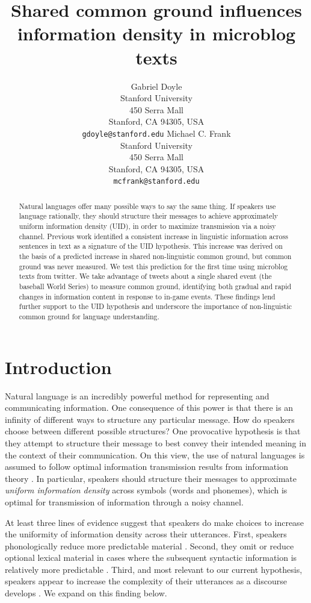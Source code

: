 \documentclass[11pt,letterpaper]{article}
\title{Shared common ground influences information density in microblog texts\Thanks{Thanks to...}}
\author{Gabriel Doyle\\
	    Stanford University\\
	    450 Serra Mall\\
	    Stanford, CA 94305, USA\\
	    {\tt gdoyle@stanford.edu}
	  \And
          Michael C. Frank\\
	    Stanford University\\
	    450 Serra Mall\\
	    Stanford, CA 94305, USA\\
	    {\tt mcfrank@stanford.edu}}
\date{}
\begin{document}
\maketitle
\begin{abstract}
Natural languages offer many possible ways to say the same thing. If speakers use language rationally, they should structure their messages to achieve approximately uniform information density (UID), in order to maximize transmission via a noisy channel. Previous work identified a consistent increase in linguistic information across sentences in text as a signature of the UID hypothesis. This increase was derived on the basis of a predicted increase in shared non-linguistic common ground, but common ground was never measured. We test this prediction for the first time using microblog texts from twitter. We take advantage of tweets about a single shared event (the baseball World Series) to measure common ground, identifying both gradual and rapid changes in information content in response to in-game events. These findings lend further support to the UID hypothesis and underscore the importance of non-linguistic common ground for language understanding.
\end{abstract}

\section{Introduction}

Natural language is an incredibly powerful method for representing and communicating information. One consequence of this power is that there is an infinity of different ways to structure any particular message. How do speakers choose between different possible structures? One provocative hypothesis is that they attempt to structure their message to best convey their intended meaning in the context of their communication. On this view, the use of natural languages is assumed to follow optimal information transmission results from information theory \cite{shannon1948}. In particular, speakers should structure their messages to approximate \emph{uniform information density} across symbols (words and phonemes), which is optimal for transmission of information through a noisy channel. 

At least three lines of evidence suggest that speakers do make choices to increase the uniformity of information density across their utterances. First, speakers phonologically reduce more predictable material \cite{aylett2004,aylett2006}. Second, they omit or reduce optional lexical material in cases where the subsequent syntactic information is relatively more predictable \cite{levy2007,frank2008,jaeger2010}. Third, and most relevant to our current hypothesis, speakers appear to increase the complexity of their utterances as a discourse develops \cite{genzel2002,genzel2003,qian2012}. We expand on this finding below.
\end{document}
